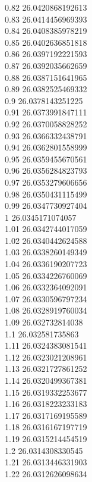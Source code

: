 {0.82	26.0420868192613\\
0.83	26.0414456969393\\
0.84	26.0408385978219\\
0.85	26.0402636851818\\
0.86	26.0397192221593\\
0.87	26.0392035662659\\
0.88	26.0387151641965\\
0.89	26.0382525469332\\
0.9	26.0378143251225\\
0.91	26.0373991847111\\
0.92	26.0370058828252\\
0.93	26.0366332438791\\
0.94	26.0362801558999\\
0.95	26.0359455670561\\
0.96	26.0356284823793\\
0.97	26.0353279606656\\
0.98	26.0350431115499\\
0.99	26.0347730927404\\
1	26.0345171074057\\
1.01	26.0342744017059\\
1.02	26.0340442624588\\
1.03	26.0338260149349\\
1.04	26.0336190207723\\
1.05	26.0334226760069\\
1.06	26.0332364092091\\
1.07	26.0330596797234\\
1.08	26.0328919760034\\
1.09	26.032732814038\\
1.1	26.032581735863\\
1.11	26.0324383081541\\
1.12	26.0323021208961\\
1.13	26.0321727861252\\
1.14	26.0320499367381\\
1.15	26.0319332253677\\
1.16	26.0318223233183\\
1.17	26.0317169195589\\
1.18	26.0316167197719\\
1.19	26.0315214454519\\
1.2	26.0314308330545\\
1.21	26.0313446331903\\
1.22	26.0312626098634\\
}
